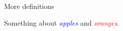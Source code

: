 \documentclass{article}
\newcommand\kw[2][blue]{\textcolor{#1}{\itshape #2}}
\begin{document}
More definitions

Something about \kw{apples} and \kw[red]{oranges}.
\end{document}
